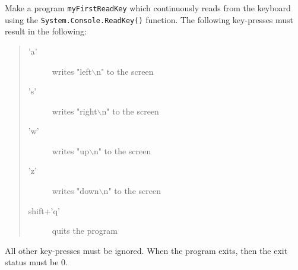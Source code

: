 Make a program \lstinline{myFirstReadKey} which continuously reads
from the keyboard using the \lstinline{System.Console.ReadKey()}
function. The following key-presses must result in the following:
\begin{quote}
  \begin{description}
  \item['a'] writes "left$\backslash$n" to the screen
  \item['s'] writes "right$\backslash$n" to the screen
  \item['w'] writes "up$\backslash$n" to the screen
  \item['z'] writes "down$\backslash$n" to the screen
  \item[shift+'q'] quits the program
  \end{description}
\end{quote}
All other key-presses must be ignored. When the program exits, then
the exit status must be 0.
